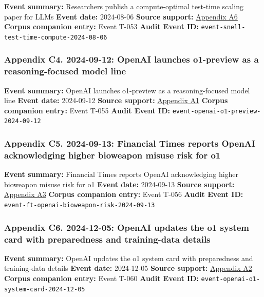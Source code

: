\documentclass[
  american,
  11pt,
  letterpaper,
]{article}
\begin{document}
\textbf{Event summary:} Researchers publish a compute-optimal test-time
scaling paper for LLMs \textbf{Event date:} 2024-08-06 \textbf{Source
support:}
\hyperref[ch-06-appendix-a6-scaling-llm-test-time-compute-optimally-can-be-more-effective-than-scaling-model-parameters]{Appendix
A6} \textbf{Corpus companion entry:} Event T-053 \textbf{Audit Event
ID:} \texttt{event-snell-test-time-compute-2024-08-06}

\subsubsection{Appendix C4. 2024-09-12: OpenAI launches o1-preview as a
reasoning-focused model
line}\label{ch-06-appendix-c4-2024-09-12-openai-launches-o1-preview-as-a-reasoning-focused-model-line}

\textbf{Event summary:} OpenAI launches o1-preview as a
reasoning-focused model line \textbf{Event date:} 2024-09-12
\textbf{Source support:}
\hyperref[ch-06-appendix-a1-learning-to-reason-with-llms]{Appendix A1}
\textbf{Corpus companion entry:} Event T-055 \textbf{Audit Event ID:}
\texttt{event-openai-o1-preview-2024-09-12}

\subsubsection{Appendix C5. 2024-09-13: Financial Times reports OpenAI
acknowledging higher bioweapon misuse risk for
o1}\label{ch-06-appendix-c5-2024-09-13-financial-times-reports-openai-acknowledging-higher-bioweapon-misuse-risk-for-o1}

\textbf{Event summary:} Financial Times reports OpenAI acknowledging
higher bioweapon misuse risk for o1 \textbf{Event date:} 2024-09-13
\textbf{Source support:}
\hyperref[ch-06-appendix-a3-openai-acknowledges-new-models-increase-risk-of-misuse-to-create-bioweapons]{Appendix
A3} \textbf{Corpus companion entry:} Event T-056 \textbf{Audit Event
ID:} \texttt{event-ft-openai-bioweapon-risk-2024-09-13}

\subsubsection{Appendix C6. 2024-12-05: OpenAI updates the o1 system
card with preparedness and training-data
details}\label{ch-06-appendix-c6-2024-12-05-openai-updates-the-o1-system-card-with-preparedness-and-training-data-details}

\textbf{Event summary:} OpenAI updates the o1 system card with
preparedness and training-data details \textbf{Event date:} 2024-12-05
\textbf{Source support:}
\hyperref[ch-06-appendix-a2-openai-o1-system-card]{Appendix A2}
\textbf{Corpus companion entry:} Event T-060 \textbf{Audit Event ID:}
\texttt{event-openai-o1-system-card-2024-12-05}
\end{document}
